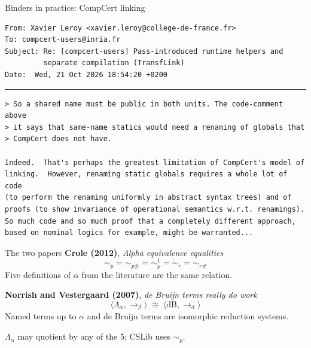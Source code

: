 \documentclass{beamer}
\newcommand{\simp}{\sim_{p}}
\newcommand{\simpf}{\sim_{p\#}}
\newcommand{\simpi}{\sim^{1}_{p}}
\newcommand{\simr}{\sim_{r}}
\newcommand{\simrf}{\sim_{r\#}}
\begin{document}
\begin{frame}[fragile]{Binders in practice: CompCert linking}
\begin{Verbatim}[fontsize=\scriptsize]
From: Xavier Leroy <xavier.leroy@college-de-france.fr>
To: compcert-users@inria.fr
Subject: Re: [compcert-users] Pass-introduced runtime helpers and
         separate compilation (TransfLink)
Date:  Wed, 21 Oct 2026 18:54:20 +0200
\end{Verbatim}
  \vspace{-1ex}\rule{\textwidth}{0.4pt}
\begin{Verbatim}[fontsize=\scriptsize]
> So a shared name must be public in both units. The code-comment above
> it says that same-name statics would need a renaming of globals that
> CompCert does not have.

Indeed.  That's perhaps the greatest limitation of CompCert's model of
linking.  However, renaming static globals requires a whole lot of code
(to perform the renaming uniformly in abstract syntax trees) and of
proofs (to show invariance of operational semantics w.r.t. renamings).
So much code and so much proof that a completely different approach,
based on nominal logics for example, might be warranted...
\end{Verbatim}
\end{frame}

\begin{frame}{The two papers}
  \textbf{Crole (2012)}, \emph{Alpha equivalence equalities}
  \[ {\simp} = {\simpf} = {\simpi} = {\simr} = {\simrf} \]
  Five definitions of $\alpha$ from the literature are the same relation.

  \vspace{2em}
  \textbf{Norrish and Vestergaard (2007)}, \emph{de Bruijn terms really do work}
  \[ \langle \Lambda_\alpha, \to_\beta \rangle \;\cong\; \langle \mathrm{dB}, \to_{\mathrm{d}} \rangle \]
  Named terms up to $\alpha$ and de Bruijn terms are isomorphic reduction systems.

  \vspace{2em}
  {\small $\Lambda_\alpha$ may quotient by any of the 5; CSLib uses $\simp$.\par}
\end{frame}
\end{document}
